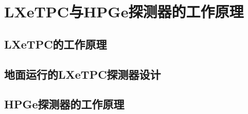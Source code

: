 
\chapter{LXeTPC与HPGe探测器的工作原理}

\section{LXeTPC的工作原理}

\section{地面运行的LXeTPC探测器设计}

\section{HPGe探测器的工作原理}
